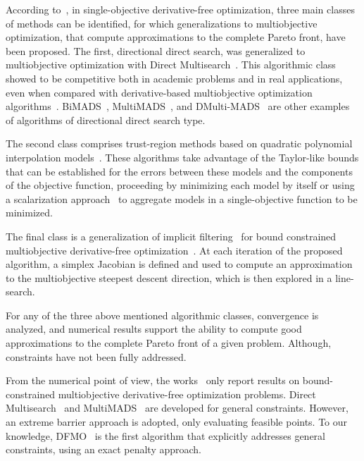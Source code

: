 \documentclass[12pt]{article}
\begin{document}
According to~\cite{conn2009}, in single-objective derivative-free
optimization, three main classes of methods can be identified, for
which generalizations to multiobjective optimization, that compute
approximations to the complete Pareto front, have been proposed.
The first, directional direct search, was generalized to
multiobjective optimization with Direct
Multisearch~\cite{custodio2011}. This algorithmic class showed to
be competitive both in academic problems and in real applications,
even when compared with derivative-based multiobjective
optimization algorithms~\cite{andreani2022}.
BiMADS~\cite{audet2008}, MultiMADS~\cite{audet2010}, and
DMulti-MADS~\cite{bigeon2020} are other examples of algorithms of
directional direct search type.

The second class comprises trust-region methods based on quadratic
polynomial interpolation models~\cite{deshpande2016,ryu2014}.
These algorithms take advantage of the Taylor-like bounds that can
be established for the errors between these models and the
components of the objective function, proceeding by minimizing
each model by itself or using a scalarization
approach~\cite{eichfelder2008} to aggregate models in a
single-objective function to be minimized.

The final class is a generalization of implicit
filtering~\cite{CTKelley_2011} for bound constrained
multiobjective derivative-free optimization~\cite{cocchi2018}. At
each iteration of the proposed algorithm, a simplex Jacobian is
defined and used to compute an approximation to the multiobjective
steepest descent direction, which is then explored in a
line-search.

For any of the three above mentioned algorithmic classes,
convergence is analyzed, and numerical results support the ability
to compute good approximations to the complete Pareto front of a
given problem. Although, constraints have not been fully
addressed.

From the numerical point of view, the
works~\cite{audet2010,audet2008,cocchi2018,custodio2011,deshpande2016,ryu2014}
only report results on bound-constrained multiobjective
derivative-free optimization problems. Direct
Multisearch~\cite{custodio2011} and MultiMADS~\cite{audet2010} are
developed for general constraints. However, an extreme barrier
approach is adopted, only evaluating feasible points. To our
knowledge, DFMO~\cite{liuzzi2016} is the first algorithm that
explicitly addresses general constraints, using an exact penalty
approach.
\end{document}
